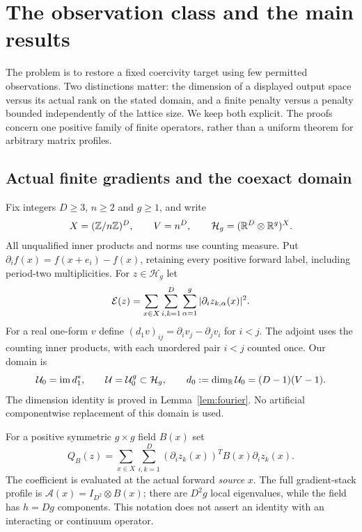 \section{The observation class and the main results}\label{sec:setup}
The problem is to restore a fixed coercivity target using few permitted
observations. Two distinctions matter: the dimension of a displayed output
space versus its actual rank on the stated domain, and a finite penalty versus
a penalty bounded independently of the lattice size. We keep both explicit.
The proofs concern one positive family of finite operators, rather than a
uniform theorem for arbitrary matrix profiles.

\subsection{Actual finite gradients and the coexact domain}
Fix integers $D\geq3$, $n\geq2$ and $g\geq1$, and write
\[
 X=(\mathbb Z/n\mathbb Z)^D,\qquad V=n^D,\qquad
 \mathcal H_g=(\mathbb R^D\otimes\mathbb R^g)^X.
\]
All unqualified inner products and norms use counting measure. Put
$\partial_i f(x)=f(x+e_i)-f(x)$, retaining every positive forward label,
including period-two multiplicities. For $z\in\mathcal H_g$ let
\[
 \mathcal E(z)=\sum_{x\in X}\sum_{i,k=1}^D\sum_{\alpha=1}^g
       |\partial_i z_{k,\alpha}(x)|^2.
\]
For a real one-form $v$ define
$(d_1v)_{ij}=\partial_i v_j-\partial_j v_i$ for $i<j$.
The adjoint uses the counting inner products, with each unordered pair $i<j$
counted once. Our domain is
\begin{equation}\label{eq:domain}
 \mathcal U_0=\operatorname{im} d_1^*,\qquad \mathcal U=\mathcal U_0^g\subset\mathcal H_g,
 \qquad d_0:=\dim_\mathbb R\mathcal U_0=(D-1)(V-1).
\end{equation}
The dimension identity is proved in Lemma~\ref{lem:fourier}. No artificial
componentwise replacement of this domain is used.

For a positive symmetric $g\times g$ field $B(x)$ set
\begin{equation}\label{eq:energy}
 Q_B(z)=\sum_{x\in X}\sum_{i,k=1}^D
       (\partial_i z_k(x))^T B(x)\partial_i z_k(x).
\end{equation}
The coefficient is evaluated at the actual forward \emph{source} $x$.
The full gradient-stack profile is $\mathcal A(x)=I_{D^2}\otimes B(x)$;
there are $D^2g$ local eigenvalues, while the field has $h=Dg$ components.
This notation does not assert an identity with an interacting or continuum
operator.

